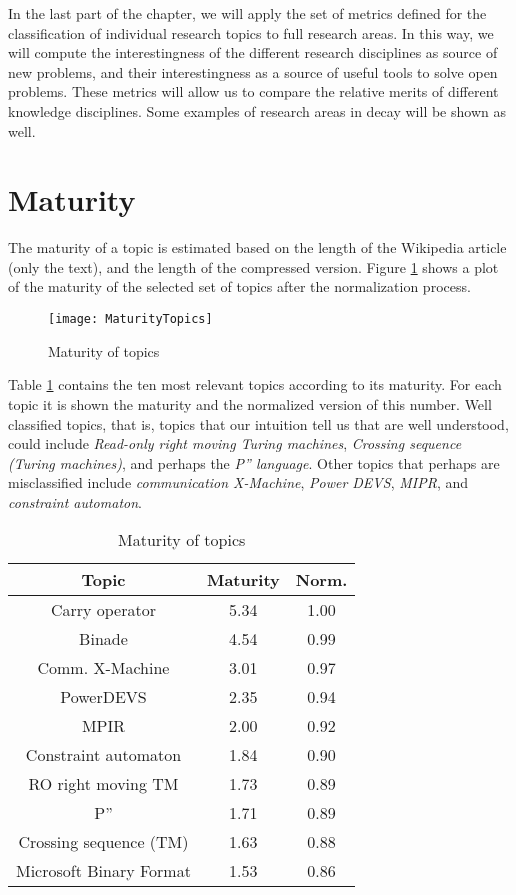In the last part of the chapter, we will apply the set of metrics defined for the classification of individual research topics to full research areas. In this way, we will compute the interestingness of the different research disciplines as source of new problems, and their interestingness as a source of useful tools to solve open problems. These metrics will allow us to compare the relative merits of different knowledge disciplines. Some examples of research areas in decay will be shown as well.

\section{Maturity}

The maturity of a topic is estimated based on the length of the Wikipedia article (only the text), and the length of the compressed version. Figure \ref{fig:Maturity-of-Topics} shows a plot of the maturity of the selected set of topics after the normalization process.

\begin{figure}[h]
\centering\texttt{[image: MaturityTopics]}
\caption{\label{fig:Maturity-of-Topics}Maturity of topics}
\end{figure}

Table \ref{tab:Maturity-of-Topics} contains the ten most relevant topics according to its maturity. For each topic it is shown the maturity and the normalized version of this number. Well classified topics, that is, topics that our intuition tell us that are well understood, could include \emph{Read-only right moving Turing machines}, \emph{Crossing sequence (Turing machines)}, and perhaps the \emph{P'' language}. Other topics that perhaps are misclassified include \emph{communication X-Machine}, \emph{Power DEVS}, \emph{MIPR}, and \emph{constraint automaton}.

\begin{table}
\begin{centering}
\begin{tabular}{|c|c|c|}
\hline 
Topic & Maturity & Norm.\tabularnewline
\hline 
\hline 
Carry operator & 5.34 & 1.00\tabularnewline
\hline 
Binade & 4.54 & 0.99\tabularnewline
\hline 
Comm. X-Machine & 3.01 & 0.97\tabularnewline
\hline 
PowerDEVS & 2.35 & 0.94\tabularnewline
\hline 
MPIR & 2.00 & 0.92\tabularnewline
\hline 
Constraint automaton & 1.84 & 0.90\tabularnewline
\hline 
RO right moving TM & 1.73 & 0.89\tabularnewline
\hline 
P'' & 1.71 & 0.89\tabularnewline
\hline 
Crossing sequence (TM) & 1.63 & 0.88\tabularnewline
\hline 
Microsoft Binary Format & 1.53 & 0.86\tabularnewline
\hline 
\end{tabular}
\par\end{centering}

\caption{\label{tab:Maturity-of-Topics}Maturity of topics}
\end{table}


